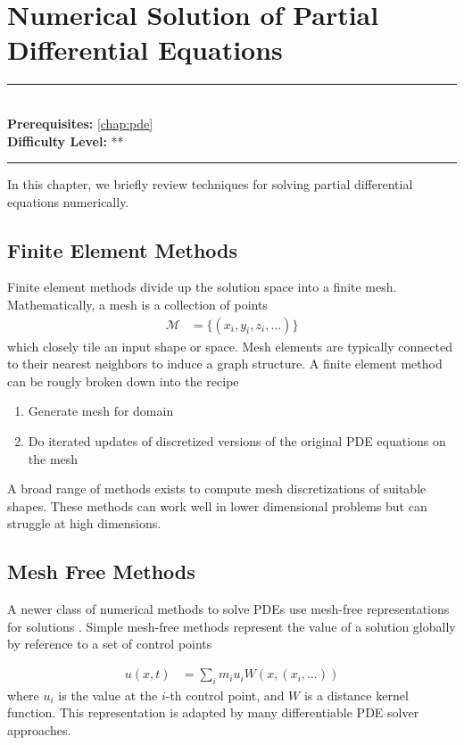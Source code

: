 \documentclass[book.tex]{subfiles}
\begin{document}
\chapter{Numerical Solution of Partial Differential Equations}

\label{chap:numerical_pde}
\noindent\rule{11cm}{0.4pt} \\
\textbf{Prerequisites:} \autoref{chap:pde} \\
\textbf{Difficulty Level:} ** \\
\noindent\rule{11cm}{0.4pt}
\vspace{5mm}

In this chapter, we briefly review techniques for solving partial differential equations numerically.

\section{Finite Element Methods}

Finite element methods divide up the solution space into a finite mesh. Mathematically, a mesh is a collection of points
\begin{align}
\mathcal{M} &= \{ (x_i,y_i,z_i,\dotsc) \}
\end{align}
which closely tile an input shape or space. Mesh elements are typically connected to their nearest neighbors to induce a graph structure. A finite element method can be rougly broken down into the recipe

\begin{enumerate}
    \item Generate mesh for domain
    \item Do iterated updates of discretized versions of the original PDE equations on the mesh
\end{enumerate}

A broad range of methods exists to compute mesh discretizations of suitable shapes. These methods can work well in lower dimensional problems but can struggle at high dimensions.

\section{Mesh Free Methods}

A newer class of numerical methods to solve PDEs use mesh-free representations for solutions \cite{fasshauer2006meshfree}. Simple mesh-free methods represent the value of a solution globally by reference to a set of control points

\begin{align}
u(x,t) &= \sum_i m_i u_i W(x, (x_i,\dotsc))
\end{align}
where $u_i$ is the value at the $i$-th control point, and $W$ is a distance kernel function. This representation is adapted by many differentiable PDE solver approaches.
\end{document}
